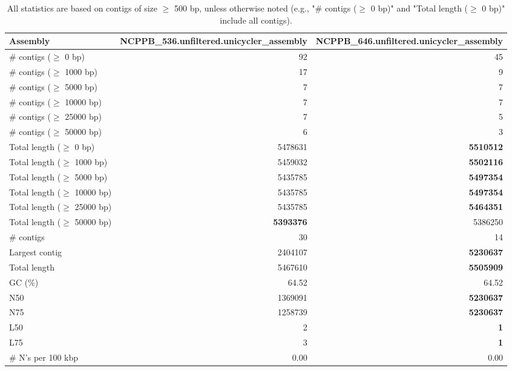 \documentclass[12pt,a4paper]{article}
\begin{document}
\begin{table}[ht]
\begin{center}
\caption{All statistics are based on contigs of size $\geq$ 500 bp, unless otherwise noted (e.g., "\# contigs ($\geq$ 0 bp)" and "Total length ($\geq$ 0 bp)" include all contigs).}
\begin{tabular}{|l*{2}{|r}|}
\hline
Assembly & NCPPB\_536.unfiltered.unicycler\_assembly & NCPPB\_646.unfiltered.unicycler\_assembly \\ \hline
\# contigs ($\geq$ 0 bp) & 92 & 45 \\ \hline
\# contigs ($\geq$ 1000 bp) & 17 & 9 \\ \hline
\# contigs ($\geq$ 5000 bp) & 7 & 7 \\ \hline
\# contigs ($\geq$ 10000 bp) & 7 & 7 \\ \hline
\# contigs ($\geq$ 25000 bp) & 7 & 5 \\ \hline
\# contigs ($\geq$ 50000 bp) & 6 & 3 \\ \hline
Total length ($\geq$ 0 bp) & 5478631 & {\bf 5510512} \\ \hline
Total length ($\geq$ 1000 bp) & 5459032 & {\bf 5502116} \\ \hline
Total length ($\geq$ 5000 bp) & 5435785 & {\bf 5497354} \\ \hline
Total length ($\geq$ 10000 bp) & 5435785 & {\bf 5497354} \\ \hline
Total length ($\geq$ 25000 bp) & 5435785 & {\bf 5464351} \\ \hline
Total length ($\geq$ 50000 bp) & {\bf 5393376} & 5386250 \\ \hline
\# contigs & 30 & 14 \\ \hline
Largest contig & 2404107 & {\bf 5230637} \\ \hline
Total length & 5467610 & {\bf 5505909} \\ \hline
GC (\%) & 64.52 & 64.52 \\ \hline
N50 & 1369091 & {\bf 5230637} \\ \hline
N75 & 1258739 & {\bf 5230637} \\ \hline
L50 & 2 & {\bf 1} \\ \hline
L75 & 3 & {\bf 1} \\ \hline
\# N's per 100 kbp & 0.00 & 0.00 \\ \hline
\end{tabular}
\end{center}
\end{table}
\end{document}
